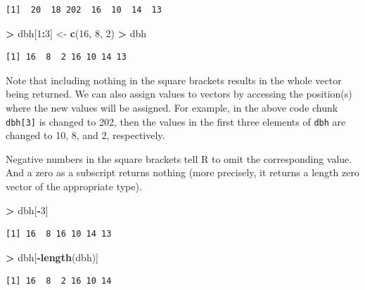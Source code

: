 \documentclass[]{krantz}
\makeatletter
\newenvironment{Shaded}{\begin{snugshade}}{\end{snugshade}}
\newcommand{\KeywordTok}[1]{\textcolor[rgb]{0.27,0.27,0.27}{\textbf{#1}}}
\newcommand{\DecValTok}[1]{\textcolor[rgb]{0.06,0.06,0.06}{#1}}
\newcommand{\StringTok}[1]{\textcolor[rgb]{0.5,0.5,0.5}{#1}}
\newcommand{\OperatorTok}[1]{\textcolor[rgb]{0.43,0.43,0.43}{\textbf{#1}}}
\newcommand{\NormalTok}[1]{#1}
\newenvironment{kframe}{%
\medskip{}
\setlength{\fboxsep}{.8em}
 \def\at@end@of@kframe{}%
 \ifinner\ifhmode%
  \def\at@end@of@kframe{\end{minipage}}%
  \begin{minipage}{\columnwidth}%
 \fi\fi%
 \def\FrameCommand##1{\hskip\@totalleftmargin \hskip-\fboxsep
 \colorbox{shadecolor}{##1}\hskip-\fboxsep
     \hskip-\linewidth \hskip-\@totalleftmargin \hskip\columnwidth}%
 \MakeFramed {\advance\hsize-\width
   \@totalleftmargin\z@ \linewidth\hsize
   \@setminipage}}%
 {\par\unskip\endMakeFramed%
 \at@end@of@kframe}
\renewenvironment{Shaded}{\begin{kframe}}{\end{kframe}}
\theoremstyle{definition}
\theoremstyle{definition}
\theoremstyle{definition}
\theoremstyle{remark}
\makeatother
\begin{document}
\begin{verbatim}
[1]  20  18 202  16  10  14  13
\end{verbatim}

\begin{Shaded}
\begin{Highlighting}[]
\OperatorTok{>}\StringTok{ }\NormalTok{dbh[}\DecValTok{1}\OperatorTok{:}\DecValTok{3}\NormalTok{] <-}\StringTok{ }\KeywordTok{c}\NormalTok{(}\DecValTok{16}\NormalTok{, }\DecValTok{8}\NormalTok{, }\DecValTok{2}\NormalTok{)}
\OperatorTok{>}\StringTok{ }\NormalTok{dbh}
\end{Highlighting}
\end{Shaded}

\begin{verbatim}
[1] 16  8  2 16 10 14 13
\end{verbatim}

Note that including nothing in the square brackets results in the whole
vector being returned. We can also assign values to vectors by accessing
the position(s) where the new values will be assigned. For example, in
the above code chunk \texttt{dbh{[}3{]}} is changed to 202, then the
values in the first three elements of \texttt{dbh} are changed to 10, 8,
and 2, respectively.

Negative numbers in the square brackets tell R to omit the corresponding
value. And a zero as a subscript returns nothing (more precisely, it
returns a length zero vector of the appropriate type).

\begin{Shaded}
\begin{Highlighting}[]
\OperatorTok{>}\StringTok{ }\NormalTok{dbh[}\OperatorTok{-}\DecValTok{3}\NormalTok{]}
\end{Highlighting}
\end{Shaded}

\begin{verbatim}
[1] 16  8 16 10 14 13
\end{verbatim}

\begin{Shaded}
\begin{Highlighting}[]
\OperatorTok{>}\StringTok{ }\NormalTok{dbh[}\OperatorTok{-}\KeywordTok{length}\NormalTok{(dbh)]}
\end{Highlighting}
\end{Shaded}

\begin{verbatim}
[1] 16  8  2 16 10 14
\end{verbatim}
\end{document}
